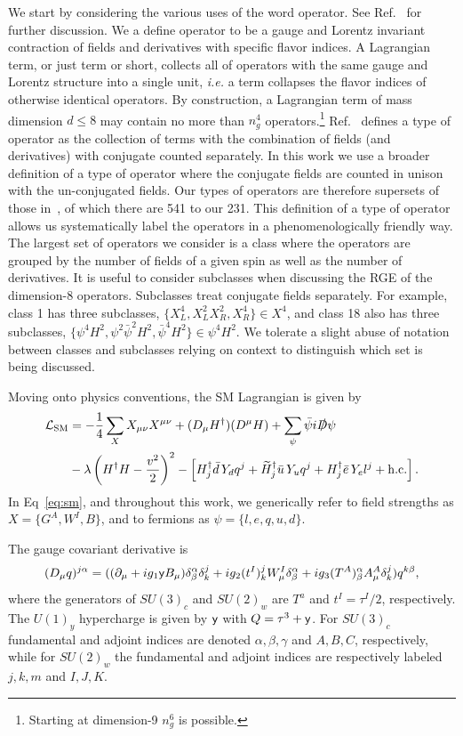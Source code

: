 We start by considering the various uses of the word operator.
See Ref.~\cite{Fonseca:2019yya} for further discussion.
We a define operator to be a gauge and Lorentz invariant contraction of fields and derivatives with specific flavor indices.
A Lagrangian term, or just term or short, collects all of operators with the same gauge and Lorentz structure into a single unit, \textit{i.e.} a term collapses the flavor indices of otherwise identical operators.
By construction, a Lagrangian term of mass dimension $d \leq 8$ may contain no more than $n_g^4$ operators.\footnote{Starting at dimension-9 $n_g^6$ is possible.}
Ref.~\cite{Fonseca:2019yya} defines a type of operator as the collection of terms with the combination of fields (and derivatives) with conjugate counted separately.
In this work we use a broader definition of a type of operator where the conjugate fields are counted in unison with the un-conjugated fields.
Our types of operators are therefore supersets of those in~\cite{Fonseca:2019yya}, of which there are 541 to our 231.
This definition of a type of operator allows us systematically label the operators in a  phenomenologically friendly way.
The largest set of operators we consider is a class where the operators are grouped by the number of fields of a given spin as well as the number of derivatives.
It is useful to consider subclasses when discussing the RGE of the dimension-8 operators. 
Subclasses treat conjugate fields separately.
For example, class 1 has three subclasses, $\{X_L^4, X_L^2 X_R^2, X_R^4\} \in X^4$, and class 18 also has three subclasses, $\{\psi^4 H^2, \psi^2 \bar \psi^2 H^2, \bar \psi^4 H^2\} \in \psi^4 H^2$.
We tolerate a slight abuse of notation between classes and subclasses relying on context to distinguish which set is being discussed.

Moving onto physics conventions, the SM Lagrangian is given by
\begin{align}
\label{eq:sm}
\mathcal L_{\rm SM} &= - \frac{1}{4} \sum_X X_{\mu\nu} X^{\mu\nu} + (D_\mu H^\dag) (D^\mu H) + \sum_\psi \bar \psi i \slashed D \psi \\
&- \lambda \left(H^\dag H - \frac{v^2}{2}\right)^2 - \left[H^\dag_j \bar d\, Y_d q^j + \widetilde H^\dag_j \bar u\, Y_u q^j + H^\dag_j \bar e\, Y_e l^j + \mathrm{h.c.} \right] . \nonumber
\end{align}
In Eq~\eqref{eq:sm}, and throughout this work, we generically refer to field strengths as $X = \{G^A, W^I, B\}$, and to fermions as $\psi = \{l, e, q, u, d\}$.

The gauge covariant derivative is
\begin{equation}
(D_\mu q)^{j \alpha} = ((\partial_\mu + i g_1 \mathsf{y} B_\mu) \delta_\beta^\alpha \delta_k^j  + i g_2 (t^I)_k^j W^I_\mu \delta_\beta^\alpha + i g_3 (T^A)_\beta^\alpha A^A_\mu \delta_k^j) q^{k \beta} ,
\end{equation}
where the generators of $SU(3)_c$ and $SU(2)_w$ are $T^a$ and $t^I = \tau^I / 2$, respectively.
The $U(1)_y$ hypercharge is given by $\mathsf{y}$ with $Q = \tau^3 + \mathsf{y}$.
For $SU(3)_c$ fundamental and adjoint indices are denoted $\alpha, \beta, \gamma$ and $A, B, C$, respectively, while for $SU(2)_w$ the fundamental and adjoint indices are respectively labeled $j, k, m$ and $I, J, K$.

